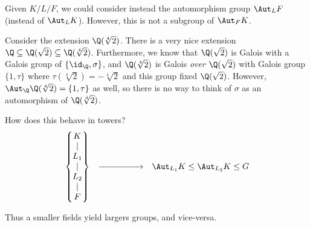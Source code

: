 \begin{warning}
Given $K/L/F$, we could consider instead the automorphism group $\Aut_L F$ (instead of $\Aut_L K$). However, this is not a subgroup of $\Aut_F K$. \\

\begin{example}
Consider the extension $\Q(\sqrt[4]{2})$. There is a very nice extension $\Q \subseteq \Q(\sqrt{2}) \subseteq \Q(\sqrt[4]{2})$. Furthermore, we know that $\Q(\sqrt{2})$ is Galois with a Galois group of $\{\id_\Q, \sigma\}$, and $\Q(\sqrt[4]{2})$ is Galois \emph{over $\Q(\sqrt{2})$} with Galois group $\{1, \tau\}$ where $\tau(\sqrt[4]{2}) = -\sqrt[4]{2}$ and this group fixed $\Q(\sqrt{2})$. However, $\Aut_{\Q} \Q(\sqrt[4]{2}) = \{1, \tau\}$ as well, so there is no way to think of $\sigma$ as an automorphism of $\Q(\sqrt[4]{2})$.
\end{example}
\end{warning}

\begin{question}
How does this behave in towers?
\[
	\begin{matrix}
	\left\{ \begin{matrix}
		K \\ \mid \\ L_1 \\ \mid \\ L_2 \\ \mid \\ F
	\end{matrix} \right\}
	 & {\xrightarrow{\hphantom{looooooooong}}} & \Aut_{L_1} K \leq \Aut_{L_2} K \leq G
	\end{matrix}
\]

Thus a smaller fields yield largers groups, and vice-versa.
\end{question}

